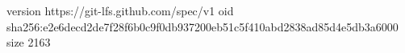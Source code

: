 version https://git-lfs.github.com/spec/v1
oid sha256:e2e6decd2de7f28f6b0c9f0db937200eb51c5f410abd2838ad85d4e5db3a6000
size 2163
